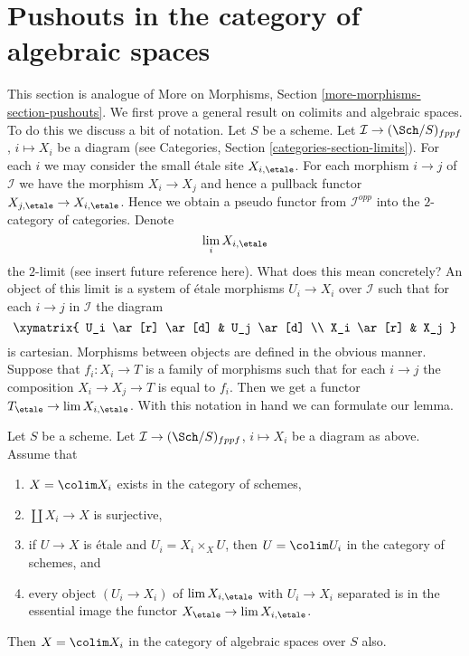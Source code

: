 \section{Pushouts in the category of algebraic spaces}
\label{section-pushouts}

\noindent
This section is analogue of
More on Morphisms, Section \ref{more-morphisms-section-pushouts}.
We first prove a general result on colimits and algebraic spaces.
To do this we discuss a bit of notation. Let $S$ be a scheme.
Let $\mathcal{I} \to (\Sch/S)_{fppf}$, $i \mapsto X_i$
be a diagram (see Categories, Section \ref{categories-section-limits}).
For each $i$ we may consider the small \'etale site $X_{i, \etale}$.
For each morphism $i \to j$ of $\mathcal{I}$ we have the morphism
$X_i \to X_j$ and hence a pullback functor
$X_{j, \etale} \to X_{i, \etale}$.
Hence we obtain a pseudo functor from $\mathcal{I}^{opp}$ into
the $2$-category of categories. Denote
$$
\lim_i X_{i, \etale}
$$
the $2$-limit (see insert future reference here). What does this mean
concretely? An object of this limit is a system of \'etale morphisms
$U_i \to X_i$ over $\mathcal{I}$ such that for each $i \to j$ in
$\mathcal{I}$ the diagram
$$
\xymatrix{
U_i \ar[r] \ar[d] & U_j \ar[d] \\
X_i \ar[r] & X_j
}
$$
is cartesian. Morphisms between objects are defined in the obvious manner.
Suppose that $f_i : X_i \to T$ is a family of morphisms such that
for each $i \to j$ the composition $X_i \to X_j \to T$ is equal to $f_i$.
Then we get a functor $T_\etale \to \lim X_{i, \etale}$.
With this notation in hand we can formulate our lemma.

\begin{lemma}
\label{lemma-colimit-agrees}
Let $S$ be a scheme. Let $\mathcal{I} \to (\Sch/S)_{fppf}$, $i \mapsto X_i$
be a diagram as above. Assume that
\begin{enumerate}
\item $X = \colim X_i$ exists in the category of schemes,
\item $\coprod X_i \to X$ is surjective,
\item if $U \to X$ is \'etale and $U_i = X_i \times_X U$, then
$U = \colim U_i$ in the category of schemes, and
\item every object $(U_i \to X_i)$ of $\lim X_{i, \etale}$
with $U_i \to X_i$ separated is in the essential image
the functor $X_\etale \to \lim X_{i, \etale}$.
\end{enumerate}
Then $X = \colim X_i$ in the category of algebraic spaces over $S$ also.
\end{lemma}

